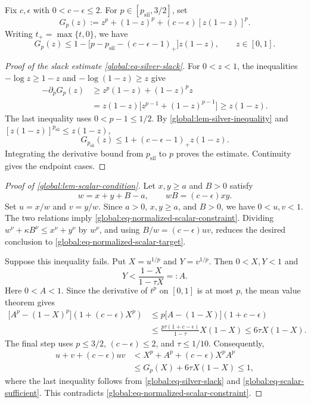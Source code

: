 \documentclass[11pt,letterpaper]{article}
\theoremstyle{definition}
\newcommand{\psil}{p_{\mathrm{sil}}}
\begin{document}
Fix $c,\epsilon$ with $0<c-\epsilon\le2$.
For $p\in[\psil,3/2]$, set
\[
 G_p(z):=z^p+(1-z)^p+(c-\epsilon)[z(1-z)]^p.
\]
Writing \(t_+=\max\{t,0\}\), we have
\begin{equation}
\label{global:eq-silver-slack}
 G_p(z) \le 1-\bigl[p-\psil-(c-\epsilon-1)_+\bigr]z(1-z), \qquad z\in[0,1].
\end{equation}

\begin{proof}[Proof of the slack estimate \eqref{global:eq-silver-slack}]
For $0<z<1$, the inequalities $-\log z\ge1-z$ and $-\log(1-z)\ge z$ give
\begin{align*}
  -\partial_pG_p(z)
  &\ge z^p(1-z)+(1-z)^p z\\
  &=z(1-z)\bigl[z^{p-1}+(1-z)^{p-1}\bigr]
  \ge z(1-z).
\end{align*}
The last inequality uses $0<p-1\le1/2$.
By \cref{global:lem-silver-inequality} and $[z(1-z)]^{\psil}\le z(1-z)$,
\[
  G_{\psil}(z)\le1+(c-\epsilon-1)_+z(1-z).
\]
Integrating the derivative bound from $\psil$ to $p$ proves the estimate.
Continuity gives the endpoint cases.
\end{proof}

\begin{proof}[Proof of \cref{global:lem-scalar-condition}]
Let $x,y\ge a$ and $B>0$ satisfy
\[
  w=x+y+B-a,\qquad wB=(c-\epsilon) xy.
\]
Set $u=x/w$ and $v=y/w$.
Since $a>0$, $x,y\ge a$, and $B>0$, we have $0<u,v<1$.
The two relations imply \eqref{global:eq-normalized-scalar-constraint}.
Dividing $w^\nu+\kappa B^\nu\le x^\nu+y^\nu$ by $w^\nu$, and using $B/w=(c-\epsilon) uv$, reduces the desired conclusion to \eqref{global:eq-normalized-scalar-target}.

Suppose this inequality fails.
Put $X=u^{1/p}$ and $Y=v^{1/p}$.
Then $0<X,Y<1$ and
\[
  Y<\frac{1-X}{1-\tau X}=:A.
\]
Here $0<A<1$.
Since the derivative of $t^p$ on $[0,1]$ is at most $p$, the mean value theorem gives
\begin{align*}
  \bigl[A^p-(1-X)^p\bigr](1+(c-\epsilon) X^p)
  &\le p\bigl[A-(1-X)\bigr](1+c-\epsilon)\\
  &\le\frac{p\tau(1+c-\epsilon)}{1-\tau}X(1-X)
  \le6\tau X(1-X).
\end{align*}
The final step uses $p\le3/2$, $(c-\epsilon)\le2$, and $\tau\le1/10$.
Consequently,
\begin{align*}
  u+v+(c-\epsilon) uv
  &<X^p+A^p+(c-\epsilon) X^pA^p\\
  &\le G_p(X)+6\tau X(1-X)\le1,
\end{align*}
where the last inequality follows from \eqref{global:eq-silver-slack} and \eqref{global:eq-scalar-sufficient}.
This contradicts \eqref{global:eq-normalized-scalar-constraint}.
\end{proof}
\end{document}
